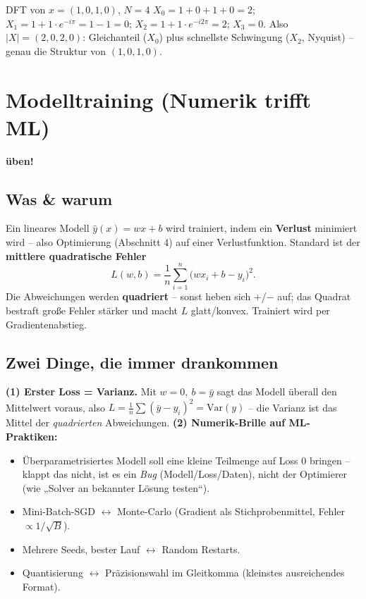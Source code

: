 \documentclass[a4paper,11pt]{article}
\newcommand{\chip}[2]{{\setlength{\fboxsep}{2.5pt}\colorbox{#1}{\color{bgdark}\footnotesize\bfseries #2}}}
\newcommand{\ueben}{\chip{rose}{üben!}}
\begin{document}
\begin{rechnung}{DFT von $x=(1,0,1,0)$, $N=4$}
$X_0=1{+}0{+}1{+}0=2$;\; $X_1=1+1\cdot e^{-i\pi}=1-1=0$;\;
$X_2=1+1\cdot e^{-i2\pi}=2$;\; $X_3=0$. Also $|X|=(2,0,2,0)$: Gleichanteil ($X_0$) plus
schnellste Schwingung ($X_2$, Nyquist) -- genau die Struktur von $(1,0,1,0)$.
\end{rechnung}

\section{Modelltraining (Numerik trifft ML)}
\ueben

\subsection{Was \& warum}
Ein lineares Modell $\hat y(x)=wx+b$ wird trainiert, indem ein \textbf{Verlust} minimiert wird --
also Optimierung (Abschnitt 4) auf einer Verlustfunktion. Standard ist der \textbf{mittlere
quadratische Fehler}
\[
  L(w,b)=\frac1n\sum_{i=1}^n\bigl(wx_i+b-y_i\bigr)^2 .
\]
Die Abweichungen werden \textbf{quadriert} -- sonst heben sich $+$/$-$ auf; das Quadrat bestraft große
Fehler stärker und macht $L$ glatt/konvex. Trainiert wird per Gradientenabstieg.

\subsection{Zwei Dinge, die immer drankommen}
\textbf{(1) Erster Loss = Varianz.} Mit $w=0,\ b=\bar y$ sagt das Modell überall den Mittelwert
voraus, also $L=\frac1n\sum(\bar y-y_i)^2=\mathrm{Var}(y)$ -- die Varianz ist das Mittel der
\emph{quadrierten} Abweichungen. \textbf{(2) Numerik-Brille auf ML-Praktiken:}
\begin{itemize}
\item Überparametrisiertes Modell soll eine kleine Teilmenge auf Loss $0$ bringen -- klappt das nicht,
  ist es ein \emph{Bug} (Modell/Loss/Daten), nicht der Optimierer (wie „Solver an bekannter Lösung testen``).
\item Mini-Batch-SGD $\leftrightarrow$ Monte-Carlo (Gradient als Stichprobenmittel, Fehler $\propto1/\sqrt B$).
\item Mehrere Seeds, bester Lauf $\leftrightarrow$ Random Restarts.
\item Quantisierung $\leftrightarrow$ Präzisionswahl im Gleitkomma (kleinstes ausreichendes Format).
\end{itemize}
\end{document}
